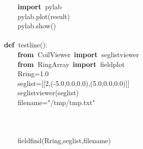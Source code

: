\documentclass{article}
\newcommand{\hlstd}[1]{\textcolor[rgb]{0,0,0}{#1}}
\newcommand{\hlnum}[1]{\textcolor[rgb]{0.16,0.16,1}{#1}}
\newcommand{\hlstr}[1]{\textcolor[rgb]{1,0,0}{#1}}
\newcommand{\hlsym}[1]{\textcolor[rgb]{0,0,0}{#1}}
\newcommand{\hlkwa}[1]{\textcolor[rgb]{0,0,0}{\bf{#1}}}
\newcommand{\hlkwd}[1]{\textcolor[rgb]{0,0,0.51}{#1}}
\begin{document}
\hlstd{}\hlstd{\ \ \ \ }\hlstd{}\hlkwa{import\ }\hlstd{pylab\hspace*{\fill}\\
}\hlstd{\ \ \ \ }\hlstd{pylab}\hlsym{.}\hlstd{}\hlkwd{plot}\hlstd{}\hlsym{(}\hlstd{result}\hlsym{)}\hspace*{\fill}\\
\hlstd{}\hlstd{\ \ \ \ }\hlstd{pylab}\hlsym{.}\hlstd{}\hlkwd{show}\hlstd{}\hlsym{()}\hspace*{\fill}\\
\hlstd{}\hspace*{\fill}\\
\hlkwa{def\ }\hlstd{}\hlkwd{testline}\hlstd{}\hlsym{():}\hspace*{\fill}\\
\hlstd{}\hlstd{\ \ \ \ }\hlstd{}\hlkwa{from\ }\hlstd{CoilViewer\ }\hlkwa{import\ }\hlstd{seglistviewer\hspace*{\fill}\\
}\hlstd{\ \ \ \ }\hlstd{}\hlkwa{from\ }\hlstd{RingArray\ }\hlkwa{import\ }\hlstd{fieldplot\hspace*{\fill}\\
}\hlstd{\ \ \ \ }\hlstd{Rring}\hlsym{=}\hlstd{}\hlnum{1.0}\hspace*{\fill}\\
\hlstd{}\hlstd{\ \ \ \ }\hlstd{seglist}\hlsym{={[}{[}}\hlstd{}\hlnum{2}\hlstd{}\hlsym{,({-}}\hlstd{}\hlnum{5.0}\hlstd{}\hlsym{,}\hlstd{}\hlnum{0.0}\hlstd{}\hlsym{,}\hlstd{}\hlnum{0.0}\hlstd{}\hlsym{),(}\hlstd{}\hlnum{5.0}\hlstd{}\hlsym{,}\hlstd{}\hlnum{0.0}\hlstd{}\hlsym{,}\hlstd{}\hlnum{0.0}\hlstd{}\hlsym{){]}{]}}\hspace*{\fill}\\
\hlstd{}\hlstd{\ \ \ \ }\hlstd{}\hlkwd{seglistviewer}\hlstd{}\hlsym{(}\hlstd{seglist}\hlsym{)}\hspace*{\fill}\\
\hlstd{}\hlstd{\ \ \ \ }\hlstd{filename}\hlsym{=}\hlstd{}\hlstr{"/tmp/tmp.txt"}\hlstd{\hspace*{\fill}\\
\hspace*{\fill}\\
\hspace*{\fill}\\
\hspace*{\fill}\\
}\hlstd{\ \ \ \ }\hlstd{}\hlkwd{fieldfind}\hlstd{}\hlsym{(}\hlstd{Rring}\hlsym{,}\hlstd{seglist}\hlsym{,}\hlstd{filename}\hlsym{)}\hspace*{\fill}\\
\end{document}
